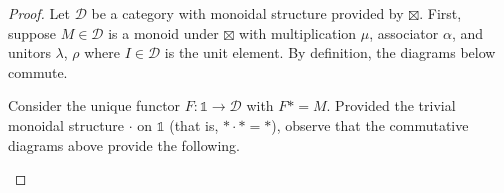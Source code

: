 \documentclass[ 12pt ]{article}
\begin{document}
\begin{enumerate}
		\begin{proof}
			Let $\mathscr{D}$ be a category with monoidal structure provided by $\boxtimes$. First, suppose $M \in \mathscr{D}$ is a monoid under $\boxtimes$ with multiplication $\mu$, associator $\alpha$, and unitors $\lambda$, $\rho$ where $I \in \mathscr{D}$ is the unit element. By definition, the diagrams below commute.
			\begin{center}
			\end{center}
			Consider the unique functor $F : \mathbb{1} \to \mathscr{D}$ with $F \ast = M$. Provided the trivial monoidal structure $\cdot$ on $\mathbb{1}$ (that is, $\ast \cdot \ast = \ast$), observe that the commutative diagrams above provide the following.
			\begin{center}
\end{center}
\end{proof}
\end{enumerate}
\end{document}
